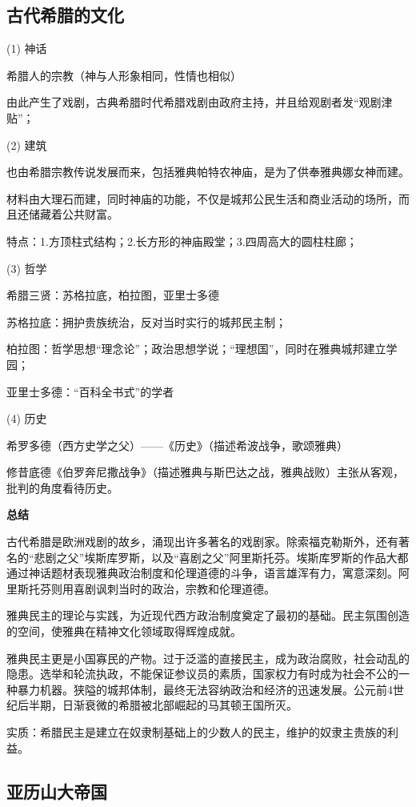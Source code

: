 \subsection{古代希腊的文化}

(1) 神话

希腊人的宗教（神与人形象相同，性情也相似）

由此产生了戏剧，古典希腊时代希腊戏剧由政府主持，并且给观剧者发“观剧津贴”；

(2) 建筑

也由希腊宗教传说发展而来，包括雅典帕特农神庙，是为了供奉雅典娜女神而建。

材料由大理石而建，同时神庙的功能，不仅是城邦公民生活和商业活动的场所，而且还储藏着公共财富。

特点：1.方顶柱式结构；2.长方形的神庙殿堂；3.四周高大的圆柱柱廊；

(3) 哲学

希腊三贤：苏格拉底，柏拉图，亚里士多德

苏格拉底：拥护贵族统治，反对当时实行的城邦民主制；

柏拉图：哲学思想“理念论”；政治思想学说；“理想国”，同时在雅典城邦建立学园；

亚里士多德：“百科全书式”的学者

(4) 历史

希罗多德（西方史学之父）——《历史》（描述希波战争，歌颂雅典）

修昔底德《伯罗奔尼撒战争》（描述雅典与斯巴达之战，雅典战败）主张从客观，批判的角度看待历史。

\textbf{总结}

古代希腊是欧洲戏剧的故乡，涌现出许多著名的戏剧家。除索福克勒斯外，还有著名的“悲剧之父”埃斯库罗斯，以及“喜剧之父”阿里斯托芬。埃斯库罗斯的作品大都通过神话题材表现雅典政治制度和伦理道德的斗争，语言雄浑有力，寓意深刻。阿里斯托芬则用喜剧讽刺当时的政治，宗教和伦理道德。

雅典民主的理论与实践，为近现代西方政治制度奠定了最初的基础。民主氛围创造的空间，使雅典在精神文化领域取得辉煌成就。

雅典民主更是小国寡民的产物。过于泛滥的直接民主，成为政治腐败，社会动乱的隐患。选举和轮流执政，不能保证参议员的素质，国家权力有时成为社会不公的一种暴力机器。狭隘的城邦体制，最终无法容纳政治和经济的迅速发展。公元前4世纪后半期，日渐衰微的希腊被北部崛起的马其顿王国所灭。

实质：希腊民主是建立在奴隶制基础上的少数人的民主，维护的奴隶主贵族的利益。

\subsection{亚历山大帝国}

